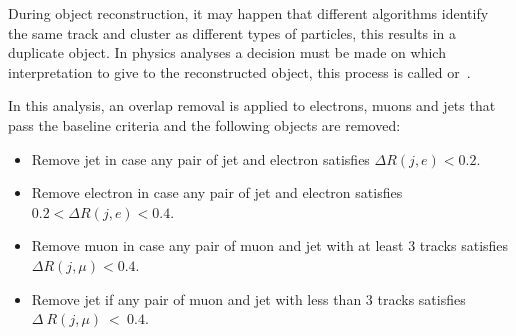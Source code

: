 During object reconstruction, it may happen that different algorithms identify
the same track and cluster as different types of particles, this results in a
duplicate object. In physics analyses a decision must be made on which
interpretation to give to the reconstructed object, this process is called
\gls{or}~\cite{Alison:1536507}.

In this analysis, an overlap removal is applied to electrons, muons and jets
that pass the baseline criteria and the following objects are removed:
\begin{itemize}
\item Remove jet in case any pair of jet and electron satisfies $\Delta R(j,
  e) < 0.2$.
\item Remove electron in case any pair of jet and electron satisfies $0.2 <
  \Delta R(j, e) < 0.4$.
\item Remove muon in case any pair of muon and jet with at least 3 tracks
  satisfies $\Delta R(j, \mu) < 0.4$.
\item Remove jet if any pair of muon and jet with less than 3 tracks satisfies
  $\Delta~R(j, \mu)~<~0.4$.
\end{itemize}
